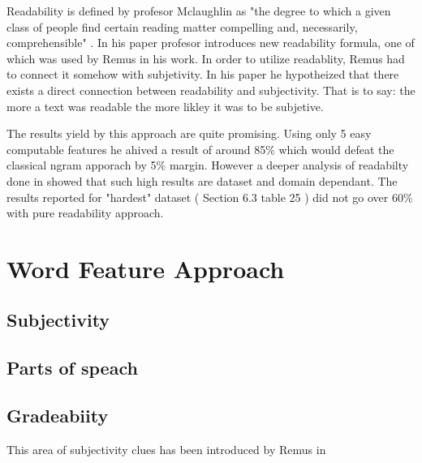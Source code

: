 Readability is defined by profesor Mclaughlin as "the degree to which a given class of people find certain reading matter compelling and,
necessarily, comprehensible" \cite{Mclaughlin1969}. In his paper profesor introduces new readability formula, one of which was used by Remus 
in his work. In order to utilize readablity, Remus had to connect it somehow with subjetivity. In his paper \cite{remus2011} he hypotheized that
there exists a direct connection between readability and subjectivity. That is to say: the more a text was readable the more likley it was to
be subjetive. 

The results yield by this approach are quite promising. Using only 5 easy computable features he ahived a result of around 85\% 
which would defeat the classical  ngram apporach by 5\% margin. However a deeper analysis of readabilty done in \cite{remus2015} showed
that such high results are dataset and domain dependant. The results reported for "hardest" dataset ( Section 6.3 table 25 ) 
did not go over 60\% with pure readability approach. 


\section{ Word Feature Approach }

\subsection{ Subjectivity }

\subsection{ Parts of speach }

\subsection{ Gradeabiity }

 This area of  subjectivity clues has been introduced by Remus in \cite{remus2005} 




